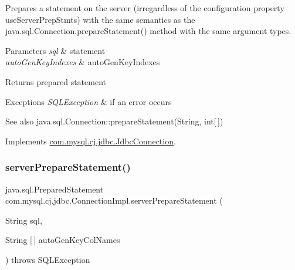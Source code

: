 Prepares a statement on the server (irregardless of the configuration property \textquotesingle{}use\+Server\+Prep\+Stmts\textquotesingle{}) with the same semantics as the java.\+sql.\+Connection.\+prepare\+Statement() method with the same argument types.


\begin{DoxyParams}{Parameters}
{\em sql} & statement \\
\hline
{\em auto\+Gen\+Key\+Indexes} & auto\+Gen\+Key\+Indexes \\
\hline
\end{DoxyParams}
\begin{DoxyReturn}{Returns}
prepared statement 
\end{DoxyReturn}

\begin{DoxyExceptions}{Exceptions}
{\em S\+Q\+L\+Exception} & if an error occurs \\
\hline
\end{DoxyExceptions}
\begin{DoxySeeAlso}{See also}
java.\+sql.\+Connection\+::prepare\+Statement(\+String, int\mbox{[}$\,$\mbox{]}) 
\end{DoxySeeAlso}


Implements \mbox{\hyperlink{interfacecom_1_1mysql_1_1cj_1_1jdbc_1_1_jdbc_connection_aefdad3d71436ba1c80d2cb1e8419dfba}{com.\+mysql.\+cj.\+jdbc.\+Jdbc\+Connection}}.

\mbox{\label{classcom_1_1mysql_1_1cj_1_1jdbc_1_1_connection_impl_ae7caa7907c0b5245c5f8ac2f209abf2a}} 
\subsubsection{\texorpdfstring{server\+Prepare\+Statement()}{serverPrepareStatement()}\hspace{0.1cm}{\footnotesize\ttfamily [6/6]}}
{\footnotesize\ttfamily java.\+sql.\+Prepared\+Statement com.\+mysql.\+cj.\+jdbc.\+Connection\+Impl.\+server\+Prepare\+Statement (\begin{DoxyParamCaption}\item[{String}]{sql,  }\item[{String \mbox{[}$\,$\mbox{]}}]{auto\+Gen\+Key\+Col\+Names }\end{DoxyParamCaption}) throws S\+Q\+L\+Exception}

